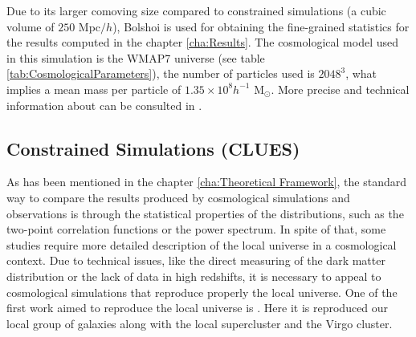 Due to its larger comoving size compared to constrained simulations (a
cubic volume of $250$ Mpc$/h$), Bolshoi is used for obtaining the 
fine-grained statistics for the results computed in the chapter
\ref{cha:Results}. The cosmological model used in this simulation is the 
WMAP7 universe (see table \ref{tab:CosmologicalParameters}), the number of
particles used is $2048^3$, what implies a mean mass per particle of 
$1.35 \times 10^8 h^{-1}$ M$_{\odot}$. More precise and technical 
information about can be consulted in \cite{klypin2011}.
\newpage



	\subsection{Constrained Simulations (CLUES)}
	\label{subsec:ConstrainedSimulations}


As has been mentioned in the chapter \ref{cha:Theoretical Framework}, the
standard way to compare the results produced by cosmological simulations 
and observations is through the statistical properties of the 
distributions, such as the two-point correlation functions or the power 
spectrum. In spite of that, some studies require more detailed description
of the local universe in a cosmological context. Due to technical issues, 
like the direct measuring of the dark matter distribution or the lack of 
data in high redshifts, it is necessary to appeal to cosmological 
simulations that reproduce properly the local universe. One of the first 
work aimed to reproduce the local universe is \cite{Klypin2003}. Here it 
is reproduced our local group of galaxies along with the local 
supercluster and the Virgo cluster.


